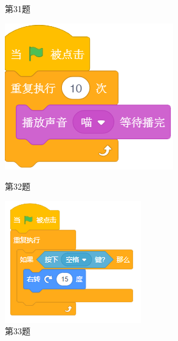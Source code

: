 \documentclass[10pt, a4paper]{article}
\begin{document}
\begin{enumerate}
\begin{figure}[htbp]
\begin{minipage}[t]{.4\textwidth}
\begin{minipage}[t]{.4\textwidth}
                \end{minipage}
                \caption*{第31题}
            \end{minipage}
            \begin{minipage}[t]{.15\textwidth}
                \centering
                \includegraphics[width=\textwidth]{32.png}
                \caption*{第32题}
            \end{minipage}
            \begin{minipage}[t]{.15\textwidth}
                \centering
                \includegraphics[width=\textwidth]{33.png}
                \caption*{第33题}
            \end{minipage}
        \end{figure}


\end{enumerate}
\end{document}
